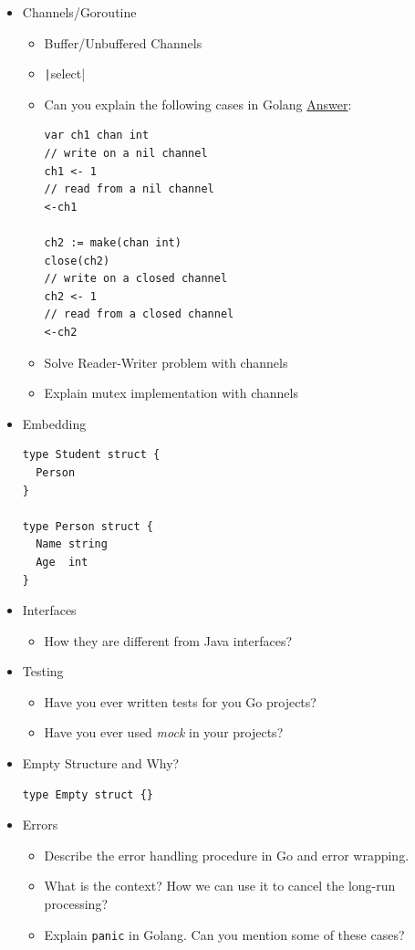 \documentclass[]{book}
\begin{document}
\begin{itemize}
  \item Channels/Goroutine
    \begin{itemize}
      \item Buffer/Unbuffered Channels
      \item \texttt|select|
      \item Can you explain the following cases in Golang \href{https://stackoverflow.com/questions/39015602/how-does-a-non-initialized-channel-behave)}{Answer}:
        \begin{verbatim}
var ch1 chan int
// write on a nil channel
ch1 <- 1
// read from a nil channel
<-ch1

ch2 := make(chan int)
close(ch2)
// write on a closed channel
ch2 <- 1
// read from a closed channel
<-ch2
        \end{verbatim}
      \item Solve Reader-Writer problem with channels
      \item Explain mutex implementation with channels
    \end{itemize}

  \item Embedding
    \begin{verbatim}
type Student struct {
  Person
}

type Person struct {
  Name string
  Age  int
}
    \end{verbatim}

  \item Interfaces
    \begin{itemize}
      \item How they are different from Java interfaces?
    \end{itemize}

  \item Testing
    \begin{itemize}
      \item Have you ever written tests for you Go projects?
      \item Have you ever used \textit{mock} in your projects?
    \end{itemize}

  \item Empty Structure and Why?
    \begin{verbatim}
type Empty struct {}
    \end{verbatim}

  \item Errors
    \begin{itemize}
      \item  Describe the error handling procedure in Go and error wrapping.
      \item What is the context? How we can use it to cancel the long-run processing?
      \item Explain \texttt{panic} in Golang. Can you mention some of these cases?
    \end{itemize}


\end{itemize}
\end{document}
